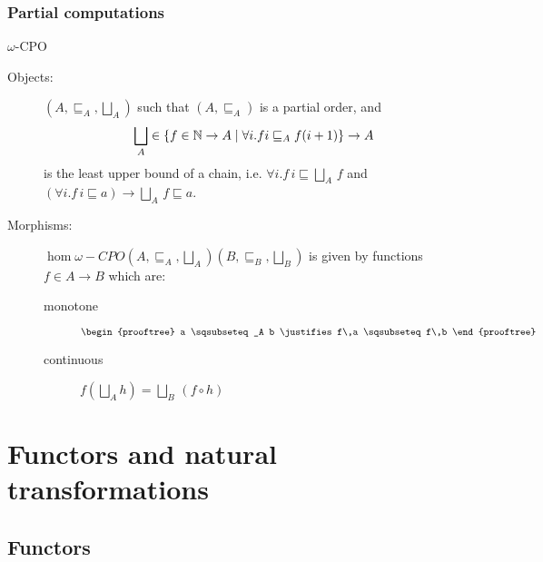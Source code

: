 \documentclass[handout]{beamer}
\newcommand{\ru}[2]{\vspace{1ex}
\begin{prooftree}
#1 \justifies #2
\end{prooftree}\vspace{1ex}}
\begin{document}
\begin{frame}
  \frametitle{Partial computations}
  
  \begin{block}{$\omega$-CPO}
   \begin{description}
   \item[Objects:] $(A,\sqsubseteq_A,\bigsqcup_A)$ such that
     $(A,\sqsubseteq_A)$ is a partial order, and 
     \[ \bigsqcup_A \in 
     \{ f \in \mathbb{N} \to A \mid \forall i.f i \sqsubseteq_A f (i+1)\} \to A \]
     is the least upper bound of a chain, i.e.
     $\forall i.f\,i \sqsubseteq  \bigsqcup_A\,f$
     and $(\forall i.f\,i \sqsubseteq a) \to \bigsqcup_A\,f\sqsubseteq a$.
    \item[Morphisms:] 
      $\hom{\omega\!-\!CPO}{(A,\sqsubseteq_A,\bigsqcup_A)}{(B,\sqsubseteq_B,\bigsqcup_B)}$
      is given by functions $f\in A \to B$ which are:
      \begin{description}
      \item[monotone] $\ru{a \sqsubseteq_A b}{f\,a \sqsubseteq f\,b}$

      \item[continuous] $f (\bigsqcup_A h) = \bigsqcup_B\,(f \circ h)$
      \end{description}
 
    \end{description}
  \end{block}
\end{frame}

\section{Functors and natural transformations}
\label{sec:funct-natur-transf}

\subsection{Functors}
\end{document}
